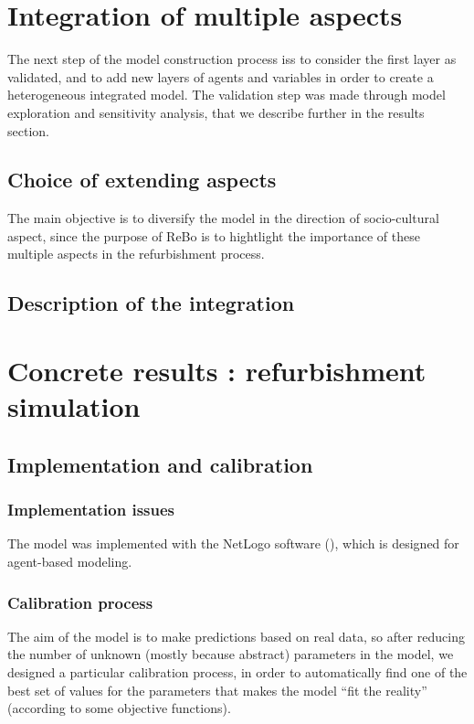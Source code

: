 \documentclass[english]{article}
\begin{document}
\section{Integration of multiple aspects}

The next step of the model construction process iss to consider the
first layer as validated, and to add new layers of agents and variables
in order to create a heterogeneous integrated model. The validation
step was made through model exploration and sensitivity analysis,
that we describe further in the results section.


\subsection*{Choice of extending aspects}

The main objective is to diversify the model in the direction of
socio-cultural aspect, since the purpose of ReBo is to hightlight
the importance of these multiple aspects in the refurbishment process.


\subsection*{Description of the integration}


\section{Concrete results : refurbishment simulation}


\subsection{Implementation and calibration}


\subsubsection{Implementation issues}

The model was implemented with the NetLogo software (\cite{NetLogo}),
which is designed for agent-based modeling.


\subsubsection{Calibration process}

The aim of the model is to make predictions based on real data, so
after reducing the number of unknown (mostly because abstract)
parameters in the model, we designed a particular calibration process,
in order to automatically find one of the best set of values for the
parameters that makes the model ``fit the reality'' (according to
some objective functions).
\end{document}
